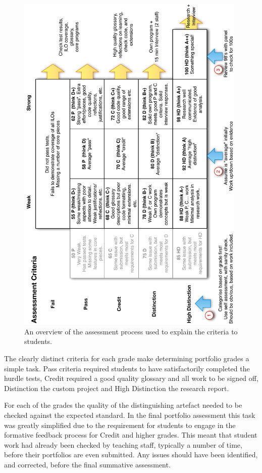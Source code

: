 \begin{figure}[htbp]
	\centering
	\includegraphics[width=0.98\textwidth]{AssessmentProcess}
	\caption{An overview of the assessment process used to explain the criteria to students.}
	\label{fig:assessment_process}
\end{figure}

The clearly distinct criteria for each grade make determining portfolio grades a simple task. Pass criteria required students to have satisfactorily completed the hurdle tests, Credit required a good quality glossary and all work to be signed off, Distinction the custom project and High Distinction the research report. 

For each of the grades the quality of the distinguishing artefact needed to be checked against the expected standard. In the final portfolio assessment this task was greatly simplified due to the requirement for students to engage in the formative feedback process for Credit and higher grades. This meant that student work had already been checked by teaching staff, typically a number of time, before their portfolios are even submitted. Any issues should have been identified, and corrected, before the final summative assessment.

